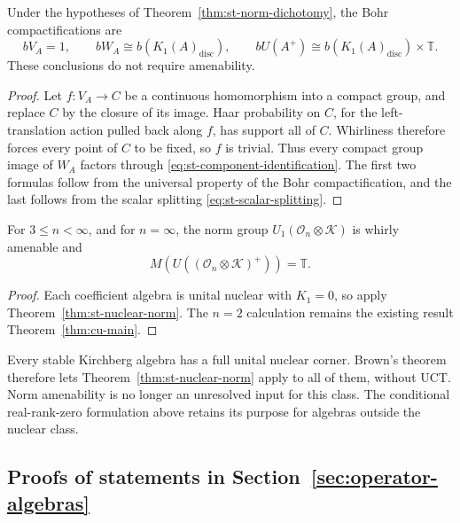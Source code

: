 \begin{corollary}\label{cor:st-norm-bohr}
 Under the hypotheses of Theorem~\ref{thm:st-norm-dichotomy}, the Bohr compactifications are 
\begin{equation*}
bV_A=1,\qquad  bW_A\cong b(K_1(A)_{\mathrm{disc}}),\qquad  bU(A^+)\cong b(K_1(A)_{\mathrm{disc}})\times\mathbb{T}. 
\end{equation*}
These conclusions do not require amenability.
\end{corollary}

\begin{proof}
Let $f:V_A\to C$ be a continuous homomorphism into a compact group, and
replace $C$ by the closure of its image. Haar probability on $C$, for the
left-translation action pulled back along $f$, has support all of $C$.
Whirliness therefore forces every point of $C$ to be fixed, so $f$ is
trivial. Thus every compact group image of $W_A$ factors through \eqref{eq:st-component-identification}. The first two formulas follow from the
universal property of the Bohr compactification, and the last follows from
the scalar splitting \eqref{eq:st-scalar-splitting}.
\end{proof}

\begin{corollary}\label{cor:st-cuntz-norm}
For \(3\leq n<\infty\), and for \(n=\infty\), the norm group
\(U_1(\mathcal O_n\otimes\mathcal K)\) is whirly amenable and
\[
 M(U((\mathcal O_n\otimes\mathcal K)^+))=\mathbb T.
\]
\end{corollary}
\begin{proof}
Each coefficient algebra is unital nuclear with \(K_1=0\), so apply
Theorem~\ref{thm:st-nuclear-norm}. The \(n=2\) calculation remains the
existing result Theorem~\ref{thm:cu-main}.
\end{proof}

Every stable Kirchberg algebra has a full unital nuclear corner.
Brown's theorem therefore lets Theorem~\ref{thm:st-nuclear-norm} apply
to all of them, without UCT. Norm amenability is no longer an unresolved
input for this class. The conditional real-rank-zero formulation above
retains its purpose for algebras outside the nuclear class.

\subsection{Proofs of statements in Section~\ref{sec:operator-algebras}}\label{sec:st-encyclopaedia-proofs}

